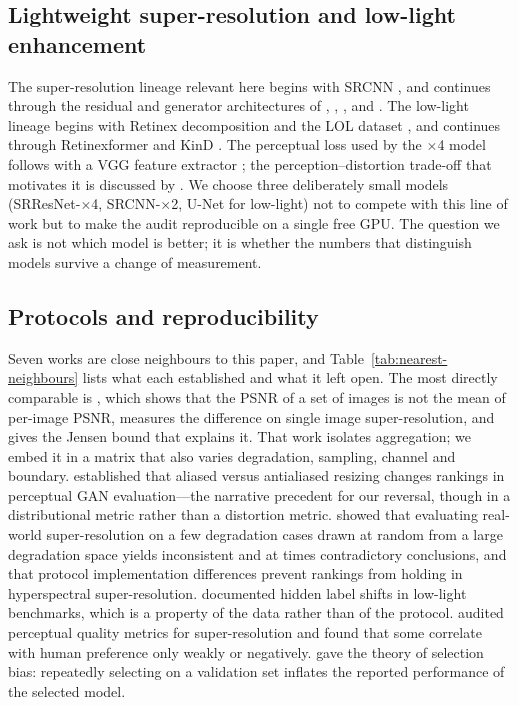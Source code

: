 \documentclass[10pt,twocolumn]{article}
\begin{document}
\subsection{Lightweight super-resolution and low-light enhancement}

The super-resolution lineage relevant here begins with SRCNN
\cite{dong2014srcnn}, and continues through the residual and generator
architectures of \cite{he2016resnet}, \cite{ledig2017srgan},
\cite{lai2019lapsrn}, \cite{lim2017edsr} and \cite{zhang2018rcan}. The
low-light lineage begins
with Retinex decomposition and the LOL dataset \cite{wei2018retinex}, and
continues through Retinexformer \cite{cai2023retinexformer} and KinD
\cite{zhang2019kind}. The perceptual loss used by the $\times$4 model
follows \cite{johnson2016perceptual} with a VGG feature extractor
\cite{simonyan2015vgg}; the perception--distortion trade-off that motivates
it is discussed by \cite{blau2018perception}. We choose three deliberately
small models (SRResNet-$\times$4, SRCNN-$\times$2, U-Net for low-light) not
to compete with this line of work but to make the audit reproducible on a
single free GPU. The question we ask is not which model is better; it is
whether the numbers that distinguish models survive a change of measurement.

\subsection{Protocols and reproducibility}

Seven works are close neighbours to this paper, and Table~\ref{tab:nearest-neighbours}
lists what each established and what it left open. The most directly
comparable is \cite{keles2021psnr}, which shows that the PSNR of a set of
images is not the mean of per-image PSNR, measures the difference on single
image super-resolution, and gives the Jensen bound that explains it. That
work isolates aggregation; we embed it in a matrix that also varies
degradation, sampling, channel and boundary. \cite{parmar2022cleanfid}
established that aliased versus antialiased resizing changes rankings in
perceptual GAN evaluation---the narrative precedent for our reversal, though
in a distributional metric rather than a distortion metric.
\cite{zhang2024seal} showed that evaluating real-world super-resolution on a
few degradation cases drawn at random from a large degradation space yields
inconsistent and at times contradictory conclusions, and \cite{shah2026hyperbench}
that protocol implementation differences prevent rankings from holding in
hyperspectral super-resolution. \cite{srinivasan2026lol} documented hidden
label shifts in low-light benchmarks, which is a property of the data rather
than of the protocol. \cite{su2025bridging} audited perceptual quality metrics
for super-resolution and found that some correlate with human preference only
weakly or negatively. \cite{cawley2010overfitting} gave the theory of
selection bias: repeatedly selecting on a validation set inflates the reported
performance of the selected model.
\end{document}
